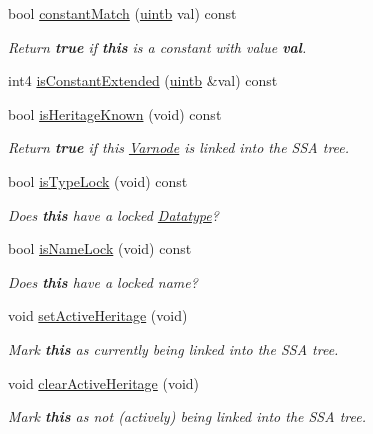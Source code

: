 \begin{DoxyCompactItemize}
bool \mbox{\hyperlink{class_varnode_a74744382f6e164a333b06640517018fc}{constant\+Match}} (\mbox{\hyperlink{types_8h_a2db313c5d32a12b01d26ac9b3bca178f}{uintb}} val) const
\begin{DoxyCompactList}\small\item\em Return {\bfseries{true}} if {\bfseries{this}} is a constant with value {\bfseries{val}}. \end{DoxyCompactList}\item 
int4 \mbox{\hyperlink{class_varnode_ab6a24df6723e760e4fa32e2cbad8b6df}{is\+Constant\+Extended}} (\mbox{\hyperlink{types_8h_a2db313c5d32a12b01d26ac9b3bca178f}{uintb}} \&val) const
\item 
bool \mbox{\hyperlink{class_varnode_a110890cf5213263aa7ee1f2dc47c1acd}{is\+Heritage\+Known}} (void) const
\begin{DoxyCompactList}\small\item\em Return {\bfseries{true}} if this \mbox{\hyperlink{class_varnode}{Varnode}} is linked into the S\+SA tree. \end{DoxyCompactList}\item 
bool \mbox{\hyperlink{class_varnode_ad24cac232b92c370f737a44a4c8f0c0e}{is\+Type\+Lock}} (void) const
\begin{DoxyCompactList}\small\item\em Does {\bfseries{this}} have a locked \mbox{\hyperlink{class_datatype}{Datatype}}? \end{DoxyCompactList}\item 
bool \mbox{\hyperlink{class_varnode_ac1b751f0ec33664d4345972da6bfcfe4}{is\+Name\+Lock}} (void) const
\begin{DoxyCompactList}\small\item\em Does {\bfseries{this}} have a locked name? \end{DoxyCompactList}\item 
void \mbox{\hyperlink{class_varnode_a61ae30aaf78c612ba253611e0aad2dc1}{set\+Active\+Heritage}} (void)
\begin{DoxyCompactList}\small\item\em Mark {\bfseries{this}} as currently being linked into the S\+SA tree. \end{DoxyCompactList}\item 
void \mbox{\hyperlink{class_varnode_acb345a601ccf9b3d13038d01b1963fa5}{clear\+Active\+Heritage}} (void)
\begin{DoxyCompactList}\small\item\em Mark {\bfseries{this}} as not (actively) being linked into the S\+SA tree. \end{DoxyCompactList}\item 

\end{DoxyCompactItemize}
